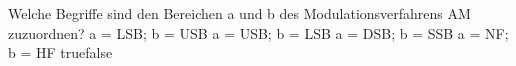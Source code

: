     {Welche Begriffe sind den Bereichen a und b des Modulationsverfahrens AM zuzuordnen?}
    {a = LSB; b = USB}
    {a = USB; b = LSB}
    {a = DSB; b = SSB}
    {a = NF; b = HF}
    {true}{false}
